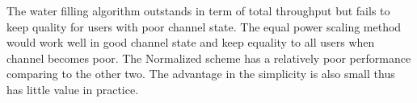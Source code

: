 \documentclass{article}
\begin{document}
\noindent
The water filling algorithm outstands in term of total throughput but fails to keep quality for users with poor channel state.
The equal power scaling method would work well in good channel state and keep equality to all users when channel becomes poor.
The Normalized scheme has a relatively poor performance comparing to the other two. The advantage in the simplicity is also small thus has little value in practice.


{}
\end{document}
